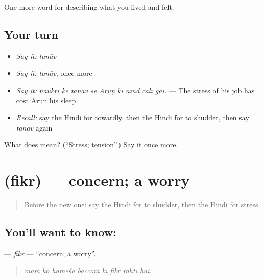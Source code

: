 \begin{grammarlens}[title={What you've built}]
One more word for describing what you lived and felt.
\end{grammarlens}

\subsection*{Your turn}
\begin{itemize}
\raggedright
  \item \emph{Say it:} \emph{tanāv}
  \item \emph{Say it:} \emph{tanāv}, once more
  \item \emph{Say it:} \emph{naukrī ke tanāv se Aruṇ kī nīnd calī gaī.} — The stress of his job has cost Arun his sleep.
  \item \emph{Recall:} say the Hindi for cowardly, then the Hindi for to shudder, then say \emph{tanāv} again
\end{itemize}

\begin{tcolorbox}[breakable,colback=teal!4,colframe=teal!35!black,title={Before you move on}]
What does  mean? (\textquotedblleft{}Stress; tension\textquotedblright{}.) Say it once more.
\end{tcolorbox}
\section[\texorpdfstring{\hi{फ़िक्र} (fikr)}{फ़िक्र (fikr)}]{ (fikr) — concern; a worry}

\label{lesson:HI-C458-fikr}



\begin{quote}
Before the new one: say the Hindi for to shudder, then the Hindi for stress.
\end{quote}

\subsection*{You'll want to know: }
\textbf{} — \emph{fikr} — \textquotedblleft{}concern; a worry\textquotedblright{}.

\begin{quote}
       
\end{quote}

\begin{quote}
\emph{māṁ ko hameśā baccoṁ kī fikr rahtī hai.}
\end{quote}

